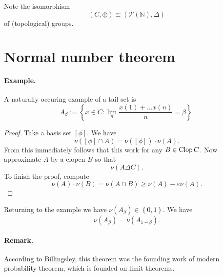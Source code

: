 Note the isomorphism
\[ 
    (C, \oplus) \cong ( \mathcal{P}( \mathbb{N} ), \Delta ) 
\]
of (topological) groups.

\section{Normal number theorem}


\paragraph{Example.} A naturally occuring example of a tail set is
\[ 
    A_\beta := \left\{ x \in C : \lim_n \frac{x(1) + \ldots x(n)}{n}= \beta \right\}.
\]


\begin{proof}
Take a basis set \( \left[ \phi \right] \). We have
\[ 
    \nu \left( \left[ \phi \right] \cap A \right) = \nu \left( \left[ \phi \right] \right) \cdot \nu(A).
\]
From this immediately follows that this work for any \( B \in \operatorname{Clop} C \).
Now approximate \( A \) by a clopen \( B \) so that
\[ 
    \nu \left( A \Delta C \right).
\]
To finish the proof, compute
\[ 
    \nu(A) \cdot \nu(B) = \nu( A \cap B ) \geqslant \nu(A) -\varepsilon\nu(A). 
\]
\end{proof}

Returning to the example we have \( \nu(A_\beta) \in \left\{ 0,1 \right\} \). We have
\[ 
    \nu(A_\beta) = \nu (A_{1-\beta}).
\]


\paragraph{Remark.} According to Billingsley, this theorem was the founding work of modern probability theorem, which is founded on limit theorems.
